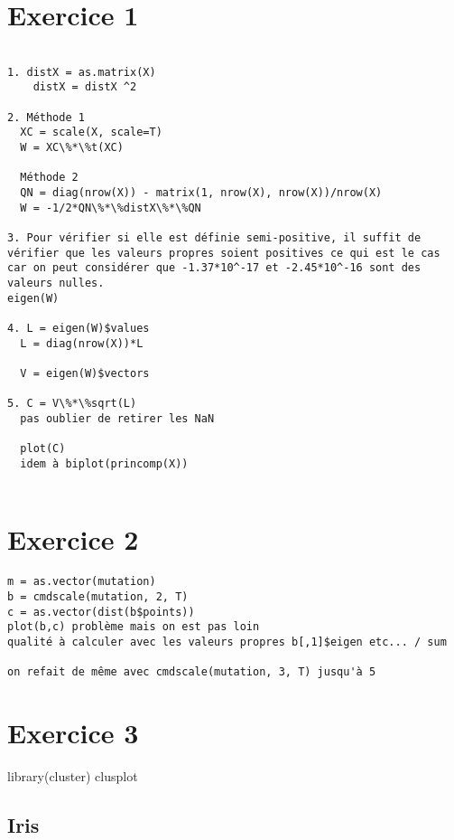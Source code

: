 \documentclass{article}\usepackage[]{graphicx}\usepackage[]{color}
\begin{document}
\section*{Exercice 1}


\begin{verbatim}

1. distX = as.matrix(X)
    distX = distX ^2
  
2. Méthode 1 
  XC = scale(X, scale=T)
  W = XC\%*\%t(XC)
  
  Méthode 2 
  QN = diag(nrow(X)) - matrix(1, nrow(X), nrow(X))/nrow(X)
  W = -1/2*QN\%*\%distX\%*\%QN
  
3. Pour vérifier si elle est définie semi-positive, il suffit de vérifier que les valeurs propres soient positives ce qui est le cas car on peut considérer que -1.37*10^-17 et -2.45*10^-16 sont des valeurs nulles. 
eigen(W)

4. L = eigen(W)$values
  L = diag(nrow(X))*L
  
  V = eigen(W)$vectors
  
5. C = V\%*\%sqrt(L)
  pas oublier de retirer les NaN
  
  plot(C)
  idem à biplot(princomp(X))
  
\end{verbatim}
  
\section*{Exercice 2}

\begin{verbatim}
m = as.vector(mutation)
b = cmdscale(mutation, 2, T)
c = as.vector(dist(b$points))
plot(b,c) problème mais on est pas loin 
qualité à calculer avec les valeurs propres b[,1]$eigen etc... / sum 

on refait de même avec cmdscale(mutation, 3, T) jusqu'à 5 

\end{verbatim}

\section*{Exercice 3} 



library(cluster)
clusplot 
\subsection*{Iris}
\end{document}
